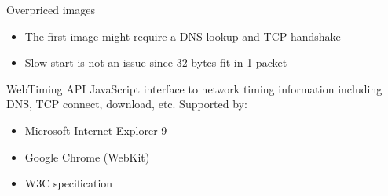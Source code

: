 \documentclass{beamer}
\begin{document}
\begin{frame}{Overpriced images}
\label{note:oversized}
  \begin{itemize}
  \item The first image might require a DNS lookup and TCP handshake
  \item Slow start is not an issue since 32 bytes fit in 1 packet
  \end{itemize}
\end{frame}

\begin{frame}{WebTiming API}
\label{note:webtiming}
  JavaScript interface to network timing information including DNS, TCP connect, download, etc.  Supported by:
  \begin{itemize}
  \item Microsoft Internet Explorer 9
  \item Google Chrome (WebKit)
  \item W3C specification
  \end{itemize}
\end{frame}
\end{document}
